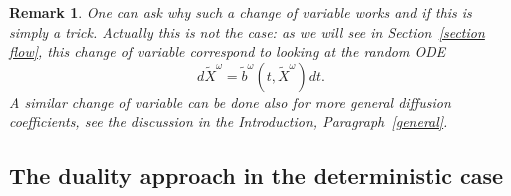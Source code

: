 \documentclass[a4paper,10pt]{article}
\newtheorem{remark}[theorem]{Remark}
\newcommand{\td}{\tilde}
\begin{document}
\begin{remark}
One can ask why such a change of variable works and if this is simply a trick. Actually this is not the case: as we will see in Section~\ref{section flow}, this change of variable correspond to looking at the random ODE
\begin{equation*}
d\td{X}^\omega=\td{b}^\omega(t,\td{X}^\omega)dt.
\end{equation*}
A similar change of variable can be done also for more general diffusion coefficients, see the discussion in the Introduction, Paragraph~\ref{general}.
\end{remark}

\subsection{The duality approach in the deterministic
case\label{subsection determ duality}}
\end{document}
